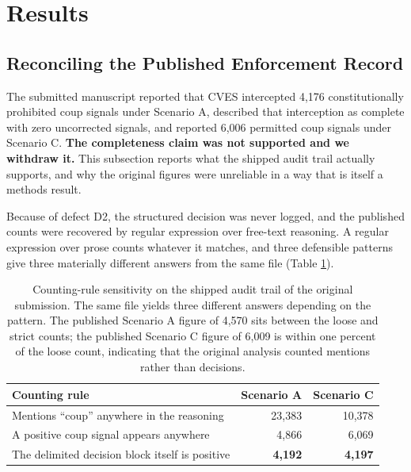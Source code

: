 \documentclass{ieeeaccess}
\newif\ifpendingvisible
\newcommand{\todo}[1]{%
  \ifpendingvisible\textcolor{red}{\textbf{[\MakeUppercase{#1}]}}\fi}
\begin{document}
\section{Results}
\label{sec:results}

\todo{SECTION STATUS: the reconciliation subsection below is complete
and final. Every other subsection is a skeleton whose numbers come from
the campaign. The campaign roster is itself pending: the decision to
exclude the designed constitution from the paid runs and the pre-flight
finding that it is currently the only encoding observed to produce an
enforcement record are in tension, and that tension is unresolved
because the observation predates the D9 fix and is therefore void. Do
not populate any number below from the superseded dataset.}

\subsection{Reconciling the Published Enforcement Record}
\label{sec:table6}
The submitted manuscript reported that CVES intercepted 4,176
constitutionally prohibited coup signals under Scenario A, described
that interception as complete with zero uncorrected signals, and
reported 6,006 permitted coup signals under Scenario C. \textbf{The
completeness claim was not supported and we withdraw it.} This
subsection reports what the shipped audit trail actually supports, and
why the original figures were unreliable in a way that is itself a
methods result.

Because of defect D2, the structured decision was never logged, and the
published counts were recovered by regular expression over free-text
reasoning. A regular expression over prose counts whatever it matches,
and three defensible patterns give three materially different answers
from the same file (Table \ref{tab:counting}).

\begin{table}[!t]
\caption{Counting-rule sensitivity on the shipped audit trail of the
original submission. The same file yields three different answers
depending on the pattern. The published Scenario A figure of 4,570 sits
between the loose and strict counts; the published Scenario C figure of
6,009 is within one percent of the loose count, indicating that the
original analysis counted mentions rather than decisions.}
\label{tab:counting}
\centering
\small
\begin{tabular}{@{}lrr@{}}
\toprule
Counting rule & Scenario A & Scenario C \\
\midrule
Mentions ``coup'' anywhere in the reasoning   & 23,383 & 10,378 \\
A positive coup signal appears anywhere       &  4,866 &  6,069 \\
The delimited decision block itself is positive & \textbf{4,192} & \textbf{4,197} \\
\bottomrule
\end{tabular}
\end{table}
\end{document}
